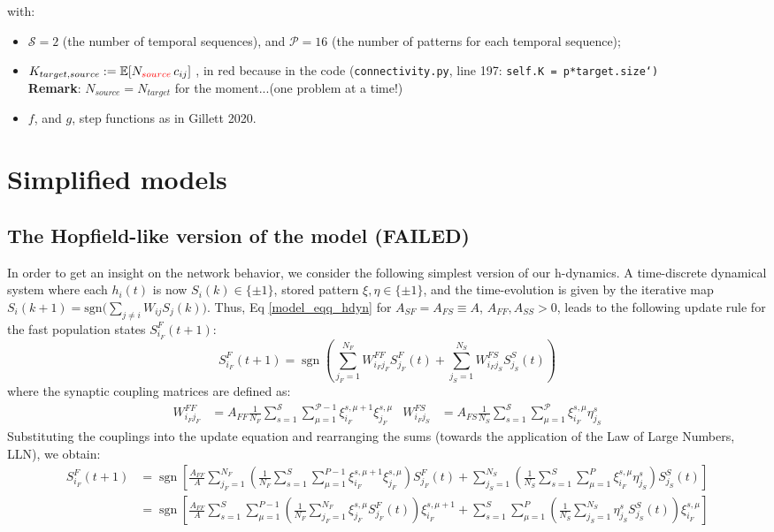 with:
\begin{itemize}
\item $\mathcal{S}=2$ (the number of temporal sequences), and $\mathcal{P}=16$ (the number of patterns for each temporal sequence);
\item $K_{target,source}:=\mathbb{E}[N_{\textcolor{red}{source}}\,c_{ij}]$ , in red because in the code (\texttt{connectivity.py}, line 197: \texttt{self.K = p*target.size`)}\\
	\textbf{Remark}: $N_{source}=N_{target}$ for the moment...(one problem at a time!) 
\item $f$, and $g$, step functions as in Gillett 2020.
\end{itemize}
\clearpage

\section{Simplified models}
\subsection{The Hopfield-like version of the model (FAILED)}
In order to get an insight on the network behavior, we consider the following simplest version of our h-dynamics. A time-discrete dynamical system where each $h_i(t)$ is now $S_i(k)\in \{\pm 1\}$, stored pattern $\xi,\eta\in\{\pm 1\}$, and the time-evolution is given by the iterative map
$ S_i(k+1)=\text{sgn}\big(\sum_{j\neq i}W_{ij}S_j(k)\big)$.  Thus, Eq \eqref{model_eqq_hdyn} for $A_{SF}=A_{FS}\equiv A$, $A_{FF},A_{SS}>0$, leads to
the following update rule for the fast population states $S_{i_F}^F(t+1)$:
\begin{equation}
S_{i_F}^F(t+1) = \operatorname{sgn}\left( \sum_{j_F=1}^{N_F} W_{i_F j_F}^{FF} S_{j_F}^F(t) + \sum_{j_S=1}^{N_S} W_{i_F j_S}^{FS} S_{j_S}^S(t) \right)
\end{equation}
where the synaptic coupling matrices are defined as:
\begin{align}
W_{i_F j_F}^{FF} &= A_{FF} \frac{1}{N_F} \sum_{s=1}^{\mathcal{S}} \sum_{\mu=1}^{\mathcal{P}-1} \xi_{i_F}^{s,\mu+1} \xi_{j_F}^{s,\mu} &
W_{i_F j_S}^{FS} &= A_{FS} \frac{1}{N_S} \sum_{s=1}^{\mathcal{S}} \sum_{\mu=1}^{\mathcal{P}} \xi_{i_F}^{s,\mu} \eta_{j_S}^{s}
\end{align}
Substituting the couplings into the update equation and rearranging the sums (towards the application of the Law of Large Numbers, LLN), we obtain:
\begin{align}
S_{i_F}^F(t+1) &= \operatorname{sgn}\left[ \frac{A_{FF}}{A} \sum_{j_F=1}^{N_F} \left( \frac{1}{N_F} \sum_{s=1}^{S} \sum_{\mu=1}^{P-1} \xi_{i_F}^{s,\mu+1} \xi_{j_F}^{s,\mu} \right) S_{j_F}^F(t) + \sum_{j_S=1}^{N_S} \left( \frac{1}{N_S} \sum_{s=1}^{S} \sum_{\mu=1}^{P} \xi_{i_F}^{s,\mu} \eta_{j_S}^{s} \right) S_{j_S}^S(t) \right] \nonumber \\
&= \operatorname{sgn}\left[ \frac{A_{FF}}{A} \sum_{s=1}^{S} \sum_{\mu=1}^{P-1} \left( \frac{1}{N_F} \sum_{j_F=1}^{N_F} \xi_{j_F}^{s,\mu} S_{j_F}^F(t) \right) \xi_{i_F}^{s,\mu+1} + \sum_{s=1}^{S} \sum_{\mu=1}^{P} \left( \frac{1}{N_S} \sum_{j_S=1}^{N_S} \eta_{j_S}^{s} S_{j_S}^S(t) \right) \xi_{i_F}^{s,\mu} \right] \tag{$\star$}
\end{align}

